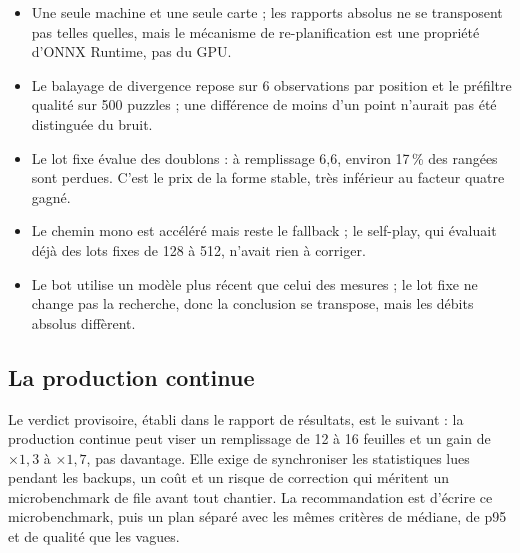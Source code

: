 \begin{itemize}[leftmargin=1.2em,itemsep=2pt]
  \item Une seule machine et une seule carte ; les rapports absolus ne se
  transposent pas telles quelles, mais le m\'ecanisme de re-planification est
  une propri\'et\'e d'ONNX Runtime, pas du GPU.
  \item Le balayage de divergence repose sur 6 observations par position et le
  pr\'efiltre qualit\'e sur 500 puzzles ; une diff\'erence de moins d'un point
  n'aurait pas \'et\'e distingu\'ee du bruit.
  \item Le lot fixe \'evalue des doublons : \`a remplissage 6,6, environ
  17\,\% des rang\'ees sont perdues. C'est le prix de la forme stable, tr\`es
  inf\'erieur au facteur quatre gagn\'e.
  \item Le chemin mono est acc\'el\'er\'e mais reste le fallback ; le
  self-play, qui \'evaluait d\'ej\`a des lots fixes de 128 \`a 512, n'avait
  rien \`a corriger.
  \item Le bot utilise un mod\`ele plus r\'ecent que celui des mesures ; le
  lot fixe ne change pas la recherche, donc la conclusion se transpose, mais
  les d\'ebits absolus diff\`erent.
\end{itemize}

\subsection{La production continue}

Le verdict provisoire, \'etabli dans le rapport de r\'esultats, est le
suivant : la production continue peut viser un remplissage de 12 \`a 16
feuilles et un gain de $\times 1{,}3$ \`a $\times 1{,}7$, pas davantage. Elle
exige de synchroniser les statistiques lues pendant les backups, un co\^ut et
un risque de correction qui m\'eritent un microbenchmark de file avant tout
chantier. La recommandation est d'\'ecrire ce microbenchmark, puis un plan
s\'epar\'e avec les m\^emes crit\`eres de m\'ediane, de p95 et de qualit\'e que
les vagues.
